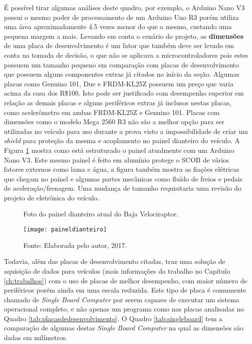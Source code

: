 É possível tirar algumas análises deste quadro, por exemplo, o Arduino Nano V3 possui o mesmo poder de processamento de um Arduino Uno R3 porém utiliza uma área aproximadamente 4.5 vezes menor do que o mesmo, custando uma pequena margem a mais. Levando em conta o cenário do projeto, as \textbf{dimensões} de uma placa de desenvolvimento é um fator que também deve ser levado em conta na tomada de decisão, o que não se aplicava a microcontroladores pois estes possuem um tamanho pequeno em comparação com placas de desenvolvimento que possuem alguns componentes extras já citados no início da seção. Algumas placas como Genuino 101, Due e FRDM-KL25Z possuem um preço que varia acima da casa dos R\$100. Isto pode ser justificado com desempenho superior em relação as demais placas e alguns periféricos extras já inclusos nestas placas, como acelerômetro em ambas FRDM-KL25Z e Genuino 101. Placas com dimensões como o modelo Mega 2560 R3 não são a melhor opção para ser utilizadas no veículo para uso durante a prova visto a impossibilidade de criar um \textit{shield} para proteção da mesma e acoplamento no painel dianteiro do veículo. A Figura \ref{fig:paineldianteiro} mostra como está estruturado o painel atualmente com um Arduino Nano V3. Este mesmo painel é feito em alumínio protege o SCOB de vários fatores externos como lama e água, a figura também mostra as fiações elétricas que chegam no painel e algumas partes mecânicas como fluído de freios e pedais de aceleração/frenagem. Uma mudança de tamanho requisitaria uma revisão do projeto de eletrônica do veículo.

\begin{figure}[!htb]
	\centering
		\caption{Foto do painel dianteiro atual do Baja Velociraptor.}
		\texttt{[image: paineldianteiro]} 
		\caption*{Fonte: Elaborada pelo autor, 2017.}
		\label{fig:paineldianteiro}
\end{figure} 
     

Todavia, além das placas de desenvolvimento citadas,  traz uma solução de aquisição de dados para veículos (mais informações do trabalho no Capítulo \ref{ch:trabalhos}) com o uso de placas de melhor desempenho, com maior número de periféricos porém ainda em uma escala reduzida. Este tipo de placa é comumente chamado de \textit{Single Board Computer} por serem capazes de executar um sistema operacional completo, e não apenas um programa como nas placas analisadas no Quadro \ref{tab:placasdedesenvolvimento}. O Quadro \ref{tab:singleboard} tem a comparação de algumas destas \textit{Single Board Computer} na qual as dimensões são dadas em milímetros.

